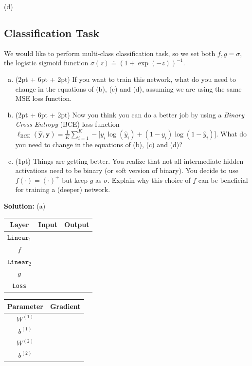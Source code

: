(d)



\subsection{Classification Task}
We would like to perform multi-class classification task, so we set both $f, g = \sigma$, the logistic sigmoid function $\sigma(z) \doteq (1 + \exp(-z))^{-1}$.

\begin{enumerate}[(a)] 
\item
(2pt + 6pt + 2pt) If you want to train this network, what do you need to change in the equations of (b), (c) and (d), assuming we are using the same MSE loss function.

\item
(2pt + 6pt + 2pt) Now you think you can do a better job by using a \emph{Binary Cross Entropy} (BCE) loss function $\ell_\text{BCE}(\bm{\hat{y}}, \bm{y}) = \frac{1}{K}\sum_{i=1}^K -\big[y_i \log(\hat{y}_i) + (1 - y_i)\log(1 - \hat{y}_i)\big]$.
What do you need to change in the equations of (b), (c) and (d)?

\item
(1pt) Things are getting better.
You realize that not all intermediate hidden activations need to be binary (or soft version of binary).
You decide to use $f(\cdot) = (\cdot)^+$ but keep $g$ as $\sigma$. Explain why this choice of $f$ can be beneficial for training a (deeper) network.


\end{enumerate}

\textbf{Solution:}
(a)
\begin{center}
    \begin{tabular}{ |c |c |c | }
    \hline
    Layer & Input & Output \\
    \hline
    $\texttt{Linear}_1$ &  &  \\
    \hline
    $f$ &  &  \\  
    \hline
    $\texttt{Linear}_2$ & &  \\
    \hline
    $g$ &  &  \\
    \hline
    \texttt{Loss} &  &  \\
    \hline
    \end{tabular}
\end{center}


\begin{center}
    \begin{tabular}{ |c |c | }
    \hline
    Parameter &  Gradient \\
    \hline
    $W^{(1)}$ &\\
    \hline
    $b^{(1)}$ &  \\ 
    \hline
    $W^{(2)}$ &  \\
    \hline
    $b^{(2)}$ & \\
    \hline
    \end{tabular}
    \end{center}

